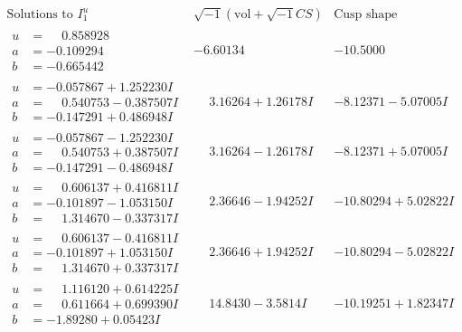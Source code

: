 \documentclass[1p]{elsarticle_modified}
\theoremstyle{definition}
\newcommand{\I}{\sqrt{-1}}
\begin{document}
$$\begin{array}{c|c|c}  
\text{Solutions to }I^u_{1}& \I (\text{vol} + \sqrt{-1}CS) & \text{Cusp shape}\\
 \hline 
\begin{aligned}
u &= \phantom{-}0.858928\phantom{ +0.000000I} \\
a &= -0.109294\phantom{ +0.000000I} \\
b &= -0.665442\phantom{ +0.000000I}\end{aligned}
 & -6.60134\phantom{ +0.000000I} & -10.5000\phantom{ +0.000000I} \\ \hline\begin{aligned}
u &= -0.057867 + 1.252230 I \\
a &= \phantom{-}0.540753 - 0.387507 I \\
b &= -0.147291 + 0.486948 I\end{aligned}
 & \phantom{-}3.16264 + 1.26178 I & -8.12371 - 5.07005 I \\ \hline\begin{aligned}
u &= -0.057867 - 1.252230 I \\
a &= \phantom{-}0.540753 + 0.387507 I \\
b &= -0.147291 - 0.486948 I\end{aligned}
 & \phantom{-}3.16264 - 1.26178 I & -8.12371 + 5.07005 I \\ \hline\begin{aligned}
u &= \phantom{-}0.606137 + 0.416811 I \\
a &= -0.101897 - 1.053150 I \\
b &= \phantom{-}1.314670 - 0.337317 I\end{aligned}
 & \phantom{-}2.36646 - 1.94252 I & -10.80294 + 5.02822 I \\ \hline\begin{aligned}
u &= \phantom{-}0.606137 - 0.416811 I \\
a &= -0.101897 + 1.053150 I \\
b &= \phantom{-}1.314670 + 0.337317 I\end{aligned}
 & \phantom{-}2.36646 + 1.94252 I & -10.80294 - 5.02822 I \\ \hline\begin{aligned}
u &= \phantom{-}1.116120 + 0.614225 I \\
a &= \phantom{-}0.611664 + 0.699390 I \\
b &= -1.89280 + 0.05423 I\end{aligned}
 & \phantom{-}14.8430 - 3.5814 I & -10.19251 + 1.82347 I \\ \hline\begin{aligned}

\end{aligned}
\end{array}$$
\end{document}
